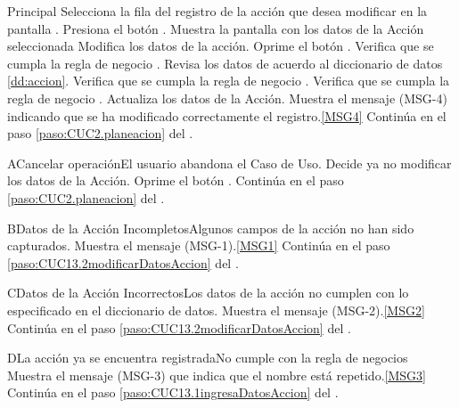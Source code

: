 	\begin{UCtrayectoria}{Principal}
			\UCpaso[\UCactor] Selecciona la fila del registro de la acción que desea modificar en la pantalla .	
			\UCpaso[\UCactor] Presiona el botón . 
			\UCpaso Muestra la pantalla  con los datos de la Acción seleccionada
                        \UCpaso [\UCactor] Modifica los datos de la acción.\label{paso:CUC13.2modificarDatosAccion}
			\UCpaso [\UCactor] Oprime el botón .
			\UCpaso Verifica que se cumpla la regla de negocio .  
			\UCpaso Revisa los datos de acuerdo al diccionario de datos \ref{dd:accion}. 
			\UCpaso Verifica que se cumpla la regla de negocio .  
			\UCpaso Verifica que se cumpla la regla de negocio .  
			\UCpaso Actualiza los datos de la Acción.
			\UCpaso Muestra el mensaje (MSG-4) indicando que se ha modificado correctamente el registro.\ref{MSG4}
			\UCpaso Continúa en el paso \ref{paso:CUC2.planeacion} del .
	\end{UCtrayectoria}

		\begin{UCtrayectoriaA}{A}{Cancelar operación}{El usuario abandona el Caso de Uso.}
			\UCpaso[\UCactor] Decide ya no modificar los datos de la Acción.
			\UCpaso[\UCactor] Oprime el botón .
			\UCpaso Continúa en el paso \ref{paso:CUC2.planeacion} del .
		\end{UCtrayectoriaA}

	\begin{UCtrayectoriaA}{B}{Datos de la Acción Incompletos}{Algunos campos de la acción no han sido capturados.}
			\UCpaso Muestra el mensaje (MSG-1).\ref{MSG1}
			\UCpaso Continúa en el paso \ref{paso:CUC13.2modificarDatosAccion} del .
	\end{UCtrayectoriaA}

	\begin{UCtrayectoriaA}{C}{Datos de la Acción Incorrectos}{Los datos de la acción no cumplen con lo especificado en el diccionario de datos.}
			\UCpaso Muestra el mensaje (MSG-2).\ref{MSG2}
			\UCpaso Continúa en el paso \ref{paso:CUC13.2modificarDatosAccion} del .
	\end{UCtrayectoriaA}
		\begin{UCtrayectoriaA}{D}{La acción ya se encuentra registrada}{No cumple con la regla de negocios }
			\UCpaso Muestra el mensaje (MSG-3) que indica que el nombre está repetido.\ref{MSG3}
			\UCpaso Continúa en el paso \ref{paso:CUC13.1ingresaDatosAccion} del .
		\end{UCtrayectoriaA}

